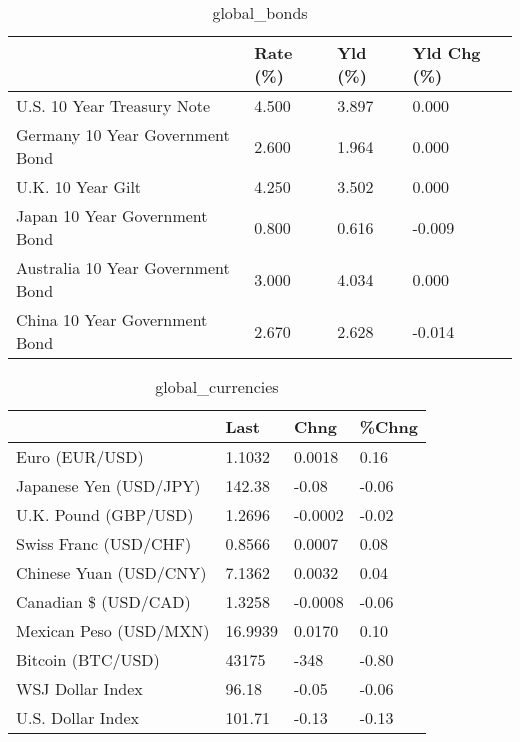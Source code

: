 \documentclass{article}%
\begin{document}
%


\begin{table}[htbp]%
\caption{global\_bonds}%
\centering%
\begin{adjustbox}{width=1\textwidth}%
\begin{tabular}{llll}
\toprule
                                  & Rate (\%) & Yld (\%) & Yld Chg (\%) \\
\midrule
       U.S. 10 Year Treasury Note &    4.500 &   3.897 &       0.000 \\
  Germany 10 Year Government Bond &    2.600 &   1.964 &       0.000 \\
                U.K. 10 Year Gilt &    4.250 &   3.502 &       0.000 \\
    Japan 10 Year Government Bond &    0.800 &   0.616 &      -0.009 \\
Australia 10 Year Government Bond &    3.000 &   4.034 &       0.000 \\
    China 10 Year Government Bond &    2.670 &   2.628 &      -0.014 \\
\bottomrule
\end{tabular}
%
\end{adjustbox}%
\end{table}

%


\begin{table}[htbp]%
\caption{global\_currencies}%
\centering%
\begin{adjustbox}{width=1\textwidth}%
\begin{tabular}{llll}
\toprule
                       &    Last &    Chng & \%Chng \\
\midrule
        Euro (EUR/USD) &  1.1032 &  0.0018 &  0.16 \\
Japanese Yen (USD/JPY) &  142.38 &   -0.08 & -0.06 \\
  U.K. Pound (GBP/USD) &  1.2696 & -0.0002 & -0.02 \\
 Swiss Franc (USD/CHF) &  0.8566 &  0.0007 &  0.08 \\
Chinese Yuan (USD/CNY) &  7.1362 &  0.0032 &  0.04 \\
  Canadian \$ (USD/CAD) &  1.3258 & -0.0008 & -0.06 \\
Mexican Peso (USD/MXN) & 16.9939 &  0.0170 &  0.10 \\
     Bitcoin (BTC/USD) &   43175 &    -348 & -0.80 \\
      WSJ Dollar Index &   96.18 &   -0.05 & -0.06 \\
     U.S. Dollar Index &  101.71 &   -0.13 & -0.13 \\
\bottomrule
\end{tabular}
%
\end{adjustbox}%
\end{table}
\end{document}
